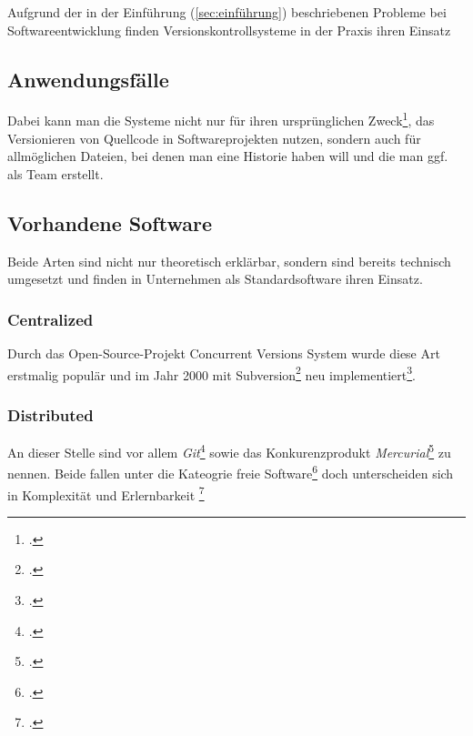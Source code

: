 Aufgrund der in der Einführung (\ref{sec:einführung}) beschriebenen Probleme bei Softwareentwicklung finden Versionskontrollsysteme in der Praxis ihren Einsatz

\subsection{Anwendungsfälle}
    Dabei kann man die Systeme nicht nur für ihren ursprünglichen Zweck\footcite[Vgl.][]{10.1371/journal.pcbi.1004668}, das Versionieren von Quellcode in Softwareprojekten nutzen, sondern auch für allmöglichen Dateien, bei denen man eine Historie haben will und die man ggf. als Team erstellt. 

\subsection{Vorhandene Software}
    Beide Arten sind nicht nur theoretisch erklärbar, sondern sind bereits technisch umgesetzt und finden in Unternehmen als Standardsoftware ihren Einsatz. 

    \subsubsection{Centralized}
        Durch das Open-Source-Projekt Concurrent Versions System wurde diese Art erstmalig populär und im Jahr 2000 mit Subversion\footcite[siehe][für eine umfangreiche Einführung]{book:svn} 
        neu implementiert\footcite[siehe][S. xi Anhang B für Unterschiede der Implementierungen]{book:svn}.
    
    \subsubsection{Distributed}
        An dieser Stelle sind vor allem 
        \emph{Git}\footcite[Siehe][für eine umfangreiche Einführung]{pro_git}
        sowie das Konkurenzprodukt
        \emph{Mercurial}\footcite[Siehe][für eine umfangreiche Einführung]{mercurial_guide}
        zu nennen. 
        Beide fallen unter die Kateogrie freie Software\footcite[Definition][S.281-284]{Grassmuck2004} 
        doch unterscheiden sich in Komplexität und Erlernbarkeit \footcite[Vgl.][]{git_vs_mer}